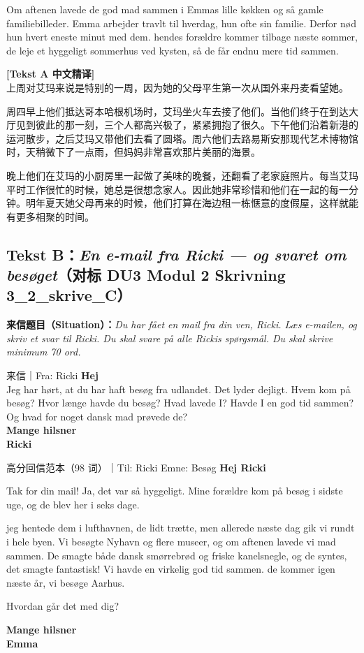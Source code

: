 Om aftenen lavede de god mad sammen i Emmas lille køkken og så gamle familiebilleder.  Emma arbejder travlt til hverdag,  hun ofte sin familie. Derfor nød hun hvert eneste minut med dem.  hendes forældre kommer tilbage næste sommer,  de leje et hyggeligt sommerhus ved kysten, så de får endnu mere tid sammen.

\begin{transbox}
\small
\textbf{\color{NCDTeal}[Tekst A 中文精译]}\\
上周对艾玛来说是特别的一周，因为她的父母平生第一次从国外来丹麦看望她。

周四早上他们抵达哥本哈根机场时，艾玛坐火车去接了他们。当他们终于在到达大厅见到彼此的那一刻，三个人都高兴极了，紧紧拥抱了很久。下午他们沿着新港的运河散步，之后艾玛又带他们去看了圆塔。周六他们去路易斯安那现代艺术博物馆时，天稍微下了一点雨，但妈妈非常喜欢那片美丽的海景。

晚上他们在艾玛的小厨房里一起做了美味的晚餐，还翻看了老家庭照片。每当艾玛平时工作很忙的时候，她总是很想念家人。因此她非常珍惜和他们在一起的每一分钟。明年夏天她父母再来的时候，他们打算在海边租一栋惬意的度假屋，这样就能有更多相聚的时间。
\end{transbox}

\subsection*{Tekst B：\textit{En e-mail fra Ricki --- og svaret om besøget}（对标 DU3 Modul 2 Skrivning 3\_2\_skrive\_C）}

\textbf{来信题目（Situation）：}\textit{Du har fået en mail fra din ven, Ricki. Læs e-mailen, og skriv et svar til Ricki. Du skal svare på alle Rickis spørgsmål. Du skal skrive minimum 70 ord.}

\begin{emailbox}{来信｜Fra: Ricki}
\textbf{Hej}\\
Jeg har hørt, at du har haft besøg fra udlandet. Det lyder dejligt. Hvem kom på besøg? Hvor længe havde du besøg? Hvad lavede I? Havde I en god tid sammen? Og hvad for noget dansk mad prøvede de?\\
\textbf{Mange hilsner}\\
\textbf{Ricki}
\end{emailbox}

\begin{emailbox}{高分回信范本（98 词）｜Til: Ricki \quad Emne: Besøg}
\textbf{Hej Ricki}

Tak for din mail! Ja, det var så hyggeligt. Mine forældre kom på besøg i sidste uge, og de blev her i seks dage.

 jeg hentede dem i lufthavnen,  de lidt trætte, men allerede næste dag gik vi rundt i hele byen. Vi besøgte Nyhavn og flere museer, og om aftenen lavede vi mad sammen. De smagte både dansk smørrebrød og friske kanelsnegle, og de syntes, det smagte fantastisk! Vi havde en virkelig god tid sammen.  de kommer igen næste år,  vi besøge Aarhus.

Hvordan går det med dig?

\textbf{Mange hilsner}\\
\textbf{Emma}
\end{emailbox}

